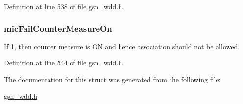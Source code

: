 Definition at line 538 of file gsn\_\-wdd.h.

\hypertarget{a00278_af8060b49986206c9a762eb3872a1ebe7}{
\subsubsection[{micFailCounterMeasureOn}]{ {\bf micFailCounterMeasureOn}}}
\label{a00278_af8060b49986206c9a762eb3872a1ebe7}
If 1, then counter measure is ON and hence association should not be allowed. 

Definition at line 544 of file gsn\_\-wdd.h.



The documentation for this struct was generated from the following file:\begin{DoxyCompactItemize}
\item 
\hyperlink{a00603}{gsn\_\-wdd.h}\end{DoxyCompactItemize}
